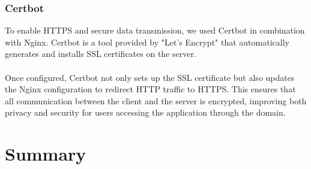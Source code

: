 \documentclass[a4paper,12pt]{report}
\begin{document}
\subsection{Certbot}
To enable HTTPS and secure data transmission, we used Certbot in combination with Nginx. Certbot is a tool provided by "Let's Encrypt" that automatically generates and installs SSL certificates on the server.\\\\
Once configured, Certbot not only sets up the SSL certificate but also updates the Nginx configuration to redirect HTTP traffic to HTTPS. This ensures that all communication between the client and the server is encrypted, improving both privacy and security for users accessing the application through the domain.

\chapter{Summary}

\printbibliography

\listoffigures
\newpage
\end{document}
